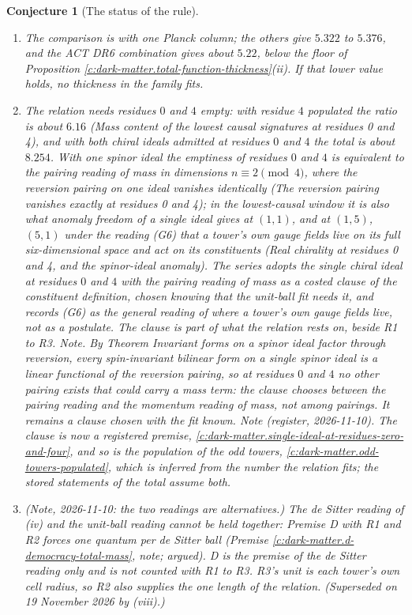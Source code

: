 \documentclass[11pt]{article}
\newtheorem{conjecture}[theorem]{Conjecture}
\theoremstyle{definition}
\theoremstyle{plain}
\begin{document}
\begin{conjecture}[The status of the rule]
\begin{enumerate}
\item[(v)] The comparison is with one Planck column; the others give $5.322$ to $5.376$, and the ACT DR6 combination gives about $5.22$, below the floor of Proposition \ref{c:dark-matter.total-function-thickness}(ii). If that lower value holds, no thickness in the family fits.
\item[(vi)] The relation needs residues $0$ and $4$ empty: with residue $4$ populated the ratio is about $6.16$ (\emph{Mass content of the lowest causal signatures at residues 0 and 4}), and with both chiral ideals admitted at residues $0$ and $4$ the total is about $8.254$. With one spinor ideal the emptiness of residues $0$ and $4$ is equivalent to the pairing reading of mass in dimensions $n \equiv 2 \pmod 4$, where the reversion pairing on one ideal vanishes identically (\emph{The reversion pairing vanishes exactly at residues 0 and 4}); in the lowest-causal window it is also what anomaly freedom of a single ideal gives at $(1,1)$, and at $(1,5)$, $(5,1)$ under the reading (G6) that a tower's own gauge fields live on its full six-dimensional space and act on its constituents (\emph{Real chirality at residues 0 and 4, and the spinor-ideal anomaly}). The series adopts the single chiral ideal at residues $0$ and $4$ with the pairing reading of mass as a costed clause of the constituent definition, chosen knowing that the unit-ball fit needs it, and records (G6) as the general reading of where a tower's own gauge fields live, not as a postulate. The clause is part of what the relation rests on, beside R1 to R3. \emph{Note.} By Theorem \emph{Invariant forms on a spinor ideal factor through reversion}, every spin-invariant bilinear form on a single spinor ideal is a linear functional of the reversion pairing, so at residues $0$ and $4$ no other pairing exists that could carry a mass term: the clause chooses between the pairing reading and the momentum reading of mass, not among pairings. It remains a clause chosen with the fit known. \emph{Note (register, 2026-11-10).} The clause is now a registered premise, \ref{c:dark-matter.single-ideal-at-residues-zero-and-four}, and so is the population of the odd towers, \ref{c:dark-matter.odd-towers-populated}, which is inferred from the number the relation fits; the stored statements of the total assume both.
\item[(vii)] \emph{(Note, 2026-11-10: the two readings are alternatives.)} The de Sitter reading of (iv) and the unit-ball reading cannot be held together: Premise D with R1 and R2 forces one quantum per de Sitter ball (Premise \ref{c:dark-matter.d-democracy-total-mass}, note; argued). D is the premise of the de Sitter reading only and is not counted with R1 to R3. R3's unit is each tower's own cell radius, so R2 also supplies the one length of the relation. \emph{(Superseded on 19 November 2026 by (viii).)}

\end{enumerate}
\end{conjecture}
\end{document}
